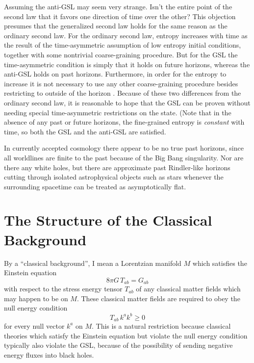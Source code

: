\documentclass[11pt]{article}
\begin{document}
Assuming the anti-GSL may seem very strange.  Isn't the entire point of the second law that it favors one direction of time over the other?  This objection presumes that the generalized second law holds for the same reason as the ordinary second law.  For the ordinary second law, entropy increases with time as the result of the time-asymmetric assumption of low entropy initial conditions, together with some nontrivial coarse-graining procedure.  But for the GSL the time-asymmetric condition is simply that it holds on future horizons, whereas the anti-GSL holds on past horizons.  Furthermore, in order for the entropy to increase it is not necessary to use any other coarse-graining procedure besides restricting to outside of the horizon \cite{10proofs}.  Because of these two differences from the ordinary second law, it is reasonable to hope that the GSL can be proven without needing special time-asymmetric restrictions on the state.  (Note that in the absence of any past or future horizons, the fine-grained entropy is \emph{constant} with time, so both the GSL and the anti-GSL are satisfied.

In currently accepted cosmology there appear to be no true past horizons, since all worldlines are finite to the past because of the Big Bang singularity.  Nor are there any white holes, but there are approximate past Rindler-like horizons cutting through isolated astrophysical objects such as stars whenever the surrounding spacetime can be treated as asymptotically flat.

\section{The Structure of the Classical Background}\label{class}

By a ``classical background'', I mean a Lorentzian manifold $M$ which satisfies the Einstein equation
\begin{equation}\label{Ein}
 8\pi G\,T_{ab} = G_{ab}
\end{equation}
with respect to the stress energy tensor $T_{ab}$ of any classical matter fields which may happen to be on $M$.  These classical matter fields are required to obey the null energy condition
\begin{equation}
T_{ab}\,k^a k^b \ge 0
\end{equation}
for every null vector $k^a$ on $M$.  This is a natural restriction because classical theories which satisfy the Einstein equation but violate the null energy condition typically also violate the GSL, because of the possibility of sending negative energy fluxes into black holes.
\end{document}

